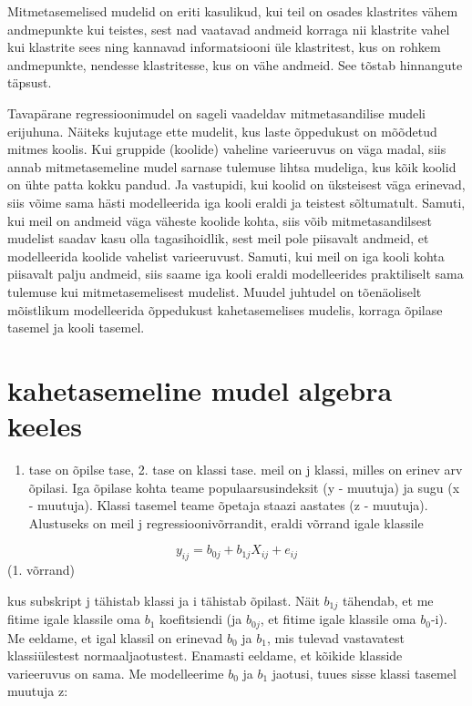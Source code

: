 \documentclass[]{book}
\providecommand{\tightlist}{%
  \setlength{\itemsep}{0pt}\setlength{\parskip}{0pt}}
\begin{document}
Mitmetasemelised mudelid on eriti kasulikud, kui teil on osades klastrites vähem andmepunkte kui teistes, sest nad vaatavad andmeid korraga nii klastrite vahel kui klastrite sees ning kannavad informatsiooni üle klastritest, kus on rohkem andmepunkte, nendesse klastritesse, kus on vähe andmeid. See tõstab hinnangute täpsust.

Tavapärane regressioonimudel on sageli vaadeldav mitmetasandilise mudeli erijuhuna. Näiteks kujutage ette mudelit, kus laste õppedukust on mõõdetud mitmes koolis. Kui gruppide (koolide) vaheline varieeruvus on väga madal, siis annab mitmetasemeline mudel sarnase tulemuse lihtsa mudeliga, kus kõik koolid on ühte patta kokku pandud. Ja vastupidi, kui koolid on üksteisest väga erinevad, siis võime sama hästi modelleerida iga kooli eraldi ja teistest sõltumatult. Samuti, kui meil on andmeid väga väheste koolide kohta, siis võib mitmetasandilsest mudelist saadav kasu olla tagasihoidlik, sest meil pole piisavalt andmeid, et modelleerida koolide vahelist varieeruvust. Samuti, kui meil on iga kooli kohta piisavalt palju andmeid, siis saame iga kooli eraldi modelleerides praktiliselt sama tulemuse kui mitmetasemelisest mudelist. Muudel juhtudel on tõenäoliselt mõistlikum modelleerida õppedukust kahetasemelises mudelis, korraga õpilase tasemel ja kooli tasemel.

\hypertarget{kahetasemeline-mudel-algebra-keeles}{%
\section{kahetasemeline mudel algebra keeles}\label{kahetasemeline-mudel-algebra-keeles}}

\begin{enumerate}
\def\labelenumi{\arabic{enumi}.}
\tightlist
\item
  tase on õpilse tase, 2. tase on klassi tase.
  meil on j klassi, milles on erinev arv õpilasi. Iga õpilase kohta teame populaarsusindeksit (y - muutuja) ja sugu (x - muutuja). Klassi tasemel teame õpetaja staazi aastates (z - muutuja).
  Alustuseks on meil j regressioonivõrrandit, eraldi võrrand igale klassile
\end{enumerate}

\[y_{ij} = b_{0j} + b_{1j}X_{ij} + e_{ij}\] (1. võrrand)

kus subskript j tähistab klassi ja i tähistab õpilast. Näit \(b_{1j}\) tähendab, et me fitime igale klassile oma \(b_1\) koefitsiendi (ja \(b_{0j}\), et fitime igale klassile oma \(b_0\)-i). Me eeldame, et igal klassil on erinevad \(b_0\) ja \(b_1\), mis tulevad vastavatest klassiülestest normaaljaotustest. Enamasti eeldame, et kõikide klasside varieeruvus on sama. Me modelleerime \(b_0\) ja \(b_1\) jaotusi, tuues sisse klassi tasemel muutuja z:
\end{document}
